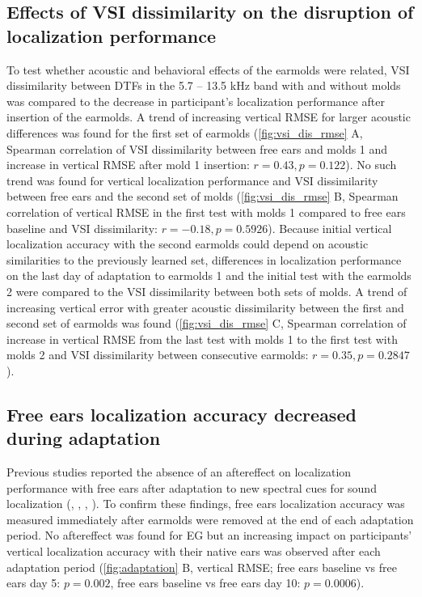 \subsection{Effects of VSI dissimilarity on the disruption of localization performance}

To test whether acoustic and behavioral effects of the earmolds were related, VSI dissimilarity between DTFs in the 5.7 – 13.5 kHz band with and without molds was compared to the decrease in participant’s localization performance after insertion of the earmolds. A trend of increasing vertical RMSE for larger acoustic differences was found for the first set of earmolds (\cref{fig:vsi_dis_rmse} A, Spearman correlation of VSI dissimilarity between free ears and molds 1 and increase in vertical RMSE after mold 1 insertion: $r = 0.43, p = 0.122$). No such trend was found for vertical localization performance and VSI dissimilarity between free ears and the second set of molds (\cref{fig:vsi_dis_rmse} B, Spearman correlation of vertical RMSE in the first test with molds 1 compared to free ears baseline and VSI dissimilarity: $r = - 0.18, p = 0.5926$). Because initial vertical localization accuracy with the second earmolds could depend on acoustic similarities to the previously learned set, differences in localization performance on the last day of adaptation to earmolds 1 and the initial test with the earmolds 2 were compared to the VSI dissimilarity between both sets of molds. A trend of increasing vertical error with greater acoustic dissimilarity between the first and second set of earmolds was found (\cref{fig:vsi_dis_rmse} C, Spearman correlation of increase in vertical RMSE from the last test with molds 1 to the first test with molds 2 and VSI dissimilarity between consecutive earmolds: $r = 0.35, p = 0.2847$). 

\subsection{Free ears localization accuracy decreased during adaptation}

Previous studies reported the absence of an aftereffect on localization performance with free ears after adaptation to new spectral cues for sound localization (\citet{hofman_relearning_1998}, \citet{trapeau_fast_2016}, \citet{carlile_relearning_2014}, \citet{wanrooij_relearning_2005}). To confirm these findings, free ears localization accuracy was measured immediately after earmolds were removed at the end of each adaptation period. No aftereffect was found for EG but an increasing impact on participants’ vertical localization accuracy with their native ears was observed after each adaptation period (\cref{fig:adaptation} B, vertical RMSE; free ears baseline vs free ears day 5: $p = 0.002$, free ears baseline vs free ears day 10: $p = 0.0006$). 

